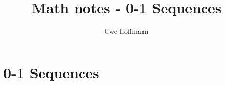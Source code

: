 

\title{Math notes - 0-1 Sequences}
\author{Uwe Hoffmann}



\setcounter{chapter}{1}
\chapter*{0-1 Sequences}
